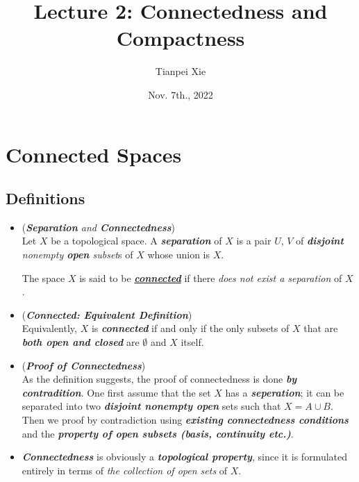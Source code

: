 \documentclass[11pt]{article}
\begin{document}
\title{Lecture 2: Connectedness and Compactness}
\author{ Tianpei Xie}
\date{Nov. 7th., 2022}
\maketitle
\tableofcontents
\newpage
\section{Connected Spaces}
\subsection{Definitions}
\begin{itemize}
\item \begin{definition}(\emph{\textbf{Separation} and \textbf{Connectedness}})\\
Let $X$ be a topological space. A \emph{\textbf{separation}} of $X$ is a pair $U$, $V$ of \emph{\textbf{disjoint} nonempty \textbf{open} subset}s of $X$ whose union is $X$. 

The space $X$ is said to be \underline{\emph{\textbf{connected}}} if there \emph{does not exist a separation} of $X$.
\end{definition}

\item  \begin{definition} (\emph{\textbf{Connected: Equivalent Definition}})\\
Equivalently, $X$ is \emph{\textbf{connected}} if and only if the only subsets of $X$ that are \emph{\textbf{both open and closed}} are $\emptyset$
and $X$ itself.
\end{definition}

\item \begin{remark} (\emph{\textbf{Proof of Connectedness}})\\
As the definition suggests, the proof of connectedness is done \emph{\textbf{by contradition}}. One first assume that the set $X$ has a \emph{\textbf{seperation}}; it can be separated into two \emph{\textbf{disjoint nonempty open}} sets such that $X = A \cup B$. Then we proof by contradiction using \emph{\textbf{existing connectedness conditions}} and the \emph{\textbf{property of open subsets (basis, continuity etc.)}}.
\end{remark}

\item \begin{remark}
\emph{\textbf{Connectedness}} is obviously a \emph{\textbf{topological property}}, since it is formulated entirely in terms of \emph{the collection of open sets} of $X$. 


\end{remark}
\end{itemize}
\end{document}
